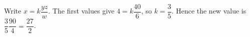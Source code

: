 Write $ x=k\dfrac{yz}{w}$. The first values give $ 4=k\dfrac{40}{6}$, so $ k=\dfrac{3}{5}$. Hence the new value is $\dfrac{3}{5}\dfrac{90}{4}=\boxed{\dfrac{27}{2}}$.
